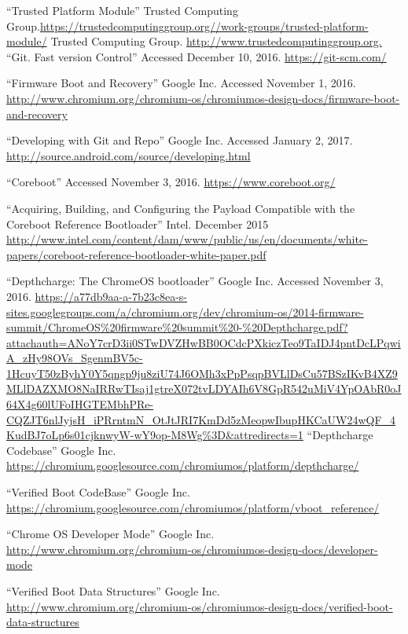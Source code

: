 \documentclass[../report.tex]{subfiles}
\begin{document}
\begin{singlespace}
\begin{flushleft}
\begin{footnotesize}
\begin{thebibliography}{\kern\bibindent}
        ``Trusted Platform Module'' Trusted Computing Group.\url{https://trustedcomputinggroup.org//work-groups/trusted-platform-module/}
        Trusted Computing Group. \url{http://www.trustedcomputinggroup.org.}
        ``Git. Fast version Control'' Accessed December 10, 2016. \url{https://git-scm.com/}

    ``Firmware Boot and Recovery'' Google Inc. Accessed November 1, 2016. \url{http://www.chromium.org/chromium-os/chromiumos-design-docs/firmware-boot-and-recovery}

    ``Developing with Git and Repo'' Google Inc. Accessed January 2, 2017. \url{http://source.android.com/source/developing.html}

    ``Coreboot'' Accessed November 3, 2016. \url{https://www.coreboot.org/}

    ``Acquiring, Building, and Configuring the Payload Compatible with the Coreboot Reference Bootloader'' Intel. December 2015 \url{http://www.intel.com/content/dam/www/public/us/en/documents/white-papers/coreboot-reference-bootloader-white-paper.pdf}

    ``Depthcharge: The ChromeOS bootloader'' Google Inc. Accessed November 3, 2016.
    \url{https://a77db9aa-a-7b23c8ea-s-sites.googlegroups.com/a/chromium.org/dev/chromium-os/2014-firmware-summit/ChromeOS\%20firmware\%20summit\%20-\%20Depthcharge.pdf?attachauth=ANoY7crD3ii0STwDVZHwBB0OCdcPXkiczTeo9TaIDJ4pntDcLPqwiA_zHy98OVs_SgenmBV5c-1HcuyT50zByhY0Y5qngp9ju8ziU74J6OMh3xPpPsqpBVLlDsCu57BSzIKvB4XZ9MLlDAZXMO8NaIRRwTIsaj1gtreX072tvLDYAIh6V8GpR542uMiV4YpOAbR0oJ64X4g60lUFoIHGTEMbhPRe-CQZJT6nlJyjsH_iPRrntmN_OtJtJRI7KmDd5zMeopwIbupHKCaUW24wQF_4KudBJ7oLp6s01cjknwyW-wY9op-M8Wg\%3D&attredirects=1}
    ``Depthcharge Codebase'' Google Inc. \url{https://chromium.googlesource.com/chromiumos/platform/depthcharge/}

    ``Verified Boot CodeBase'' Google Inc. \url{https://chromium.googlesource.com/chromiumos/platform/vboot_reference/}

    ``Chrome OS Developer Mode'' Google Inc. \url{http://www.chromium.org/chromium-os/chromiumos-design-docs/developer-mode}

    ``Verified Boot Data Structures'' Google Inc. \url{http://www.chromium.org/chromium-os/chromiumos-design-docs/verified-boot-data-structures}


\end{thebibliography}
\end{footnotesize}
\end{flushleft}
\end{singlespace}
\end{document}
